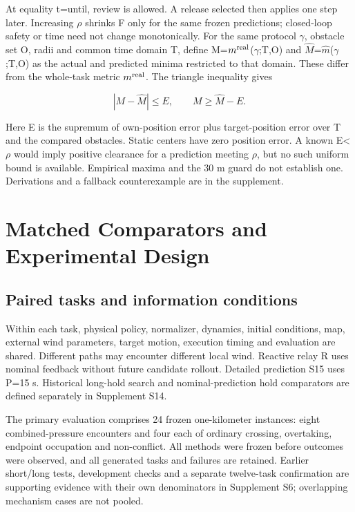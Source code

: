 \documentclass[conference]{IEEEtran}
\begin{document}
At equality t=until, review is allowed. A release selected then applies one step later. Increasing \ensuremath{\rho} shrinks F only for the same frozen predictions; closed-loop safety or time need not change monotonically. For the same protocol \ensuremath{\gamma}, obstacle set O, radii and common time domain T, define M=$m^{\rm real}$(\ensuremath{\gamma};T,O) and $\widehat M$=$\hat m$(\ensuremath{\gamma};T,O) as the actual and predicted minima restricted to that domain. These differ from the whole-task metric $m^{\rm real}$. The triangle inequality gives

\begin{equation}\label{eq:5}
|M-\widehat M|\le E,\qquad M\ge\widehat M-E.
\end{equation}

Here E is the supremum of own-position error plus target-position error over T and the compared obstacles. Static centers have zero position error. A known E<\ensuremath{\rho} would imply positive clearance for a prediction meeting \ensuremath{\rho}, but no such uniform bound is available. Empirical maxima and the 30 m guard do not establish one. Derivations and a fallback counterexample are in the supplement.

\section{Matched Comparators and Experimental Design}

\subsection{Paired tasks and information conditions}

Within each task, physical policy, normalizer, dynamics, initial conditions, map, external wind parameters, target motion, execution timing and evaluation are shared. Different paths may encounter different local wind. Reactive relay R uses nominal feedback without future candidate rollout. Detailed prediction S15 uses P=15 s. Historical long-hold search and nominal-prediction hold comparators are defined separately in Supplement S14.

The primary evaluation comprises 24 frozen one-kilometer instances: eight combined-pressure encounters and four each of ordinary crossing, overtaking, endpoint occupation and non-conflict. All methods were frozen before outcomes were observed, and all generated tasks and failures are retained. Earlier short/long tests, development checks and a separate twelve-task confirmation are supporting evidence with their own denominators in Supplement S6; overlapping mechanism cases are not pooled.
\end{document}
